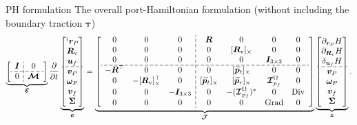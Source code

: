 \documentclass[aspectratio=169]{ISAE-Beamer}
\DeclareMathOperator*{\Grad}{Grad}
\DeclareMathOperator*{\Div}{Div}
\newcommand{\crmat}[1]{\ensuremath{[#1]_{\times}}}
\begin{document}
\begin{frame}{PH formulation}
The overall port-Hamiltonian formulation (without including the boundary traction $\bm{\tau}$)
\begin{equation*}
\setlength{\dashlinegap}{2pt}
\underbrace{
{\left[ \begin{array}{c:c}
\bm{I} & 0 \\
\hdashline
0 & \bm{\mathcal{M}} \\
\end{array} \right]}
}_{\bm{\mathcal{E}}}
\diffp{}{t}
\underbrace{\begin{bmatrix}
^i \bm{r}_P \\ \bm{R}_{\text{v}} \\ \bm{u}_f \\\hdashline  \bm{v}_P \\ \bm\omega_P  \\ \bm{v}_f  \\ \bm\Sigma \\
\end{bmatrix}}_{\bm{e}} = 
\underbrace{
{\left[ \begin{array}{ccc:cccc}
0 & 0 & 0 &  \bm{R} & 0 & 0 & 0 \\
0 & 0 & 0 & 0 & \crmat{\bm{R}_{\text{v}}} & 0 & 0 \\
0 & 0 & 0 & 0 & 0 & \bm{I}_{3\times 3} & 0  \\ 
\hdashline
-\bm{R}^\top & 0 & 0 & 0 & \crmat{\widetilde{\bm{p}}_t} & 0 & 0 \\
0 & -\crmat{\bm{R}_{\text{v}}}^\top & 0 & \crmat{\widetilde{\bm{p}}_t} & \crmat{\widetilde{\bm{p}}_r} & \bm{\mathcal{I}}_{p_f}^\Omega & 0 \\
0 & 0 & -\bm{I}_{3\times 3} & 0 & -(\bm{\mathcal{I}}_{p_f}^\Omega)^* & 0 & \Div \\
0 & 0 & 0 & 0 & 0 & \Grad & 0 \\
\end{array} \right]}
}_{\bm{\mathcal{J}}}
\underbrace{\begin{bmatrix}
\partial_{\bm{r}_P}H \\ \partial_{\bm{R}_\text{v}}H \\ \delta_{\bm{u}_f} H \\\hdashline  \bm{v}_P \\ \bm\omega_P  \\ \bm{v}_f  \\ \bm\Sigma \\
\end{bmatrix}}_{\bm{z}}.
\end{equation*} 

\end{frame}
\end{document}
